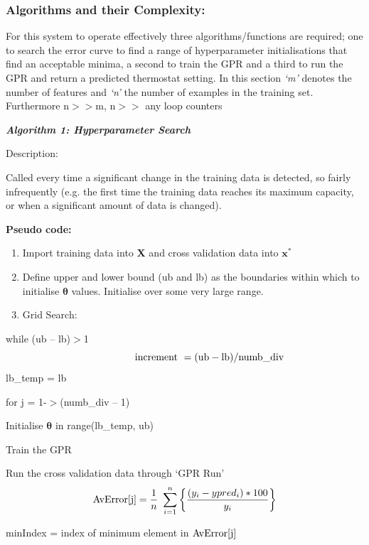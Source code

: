 \documentclass[10.5pt,a4paper,twoside]{report}   %
\begin{document}
\subsubsection{Algorithms and their Complexity:}

\noindent For this system to operate effectively three algorithms/functions are required; one to search the error curve to find a range of hyperparameter initialisations that find an acceptable minima, a second to train the GPR and a third to run the GPR and return a predicted thermostat setting. In this section \textit{`m'} denotes the number of features and \textit{`n'} the number of examples in the training set. Furthermore n$>$$>$m,  n$>$$>$ any loop counters

\noindent \textbf{\textit{Algorithm 1: Hyperparameter Search}}

\noindent Description:

\noindent Called every time a significant change in the training data is detected, so fairly infrequently (e.g. the first time the training data reaches its maximum capacity, or when a significant amount of data is changed).

\noindent \textbf{Pseudo code:}

\begin{enumerate}
\item \textbf{ }Import training data into \textbf{X} and cross validation data into ${{\mathbf x}}^{{\mathbf *}}$\textbf{ }

\item  Define upper and lower bound (ub and lb) as the boundaries within which to initialise ${\mathbf \theta }$ values. Initialise over some very large range. 

\item  Grid Search:
\end{enumerate}

\noindent while (ub -- lb)$>$1
\[{\rm \ \ \ \ \ \ \ \ \ \ \ \ \ \ \ increment\ =(ub-lb)}{\rm /numb\_div}\] 
lb\_temp = lb

 for j = 1-$>$(numb\_div -- 1)

  Initialise ${\mathbf \theta }$\textbf{ }in range(lb\_temp, ub)

  Train the GPR

  Run the cross validation data through `GPR Run' 
\[{\rm AvError[j]}=\frac{1}{n}\ \sum^n_{i=1}{\left\{\frac{\left(y_i-ypred_i\right)*100}{y_i}\right\}}\] 

 minIndex =  index of minimum element in ${\rm AvError[j]}$
\end{document}
